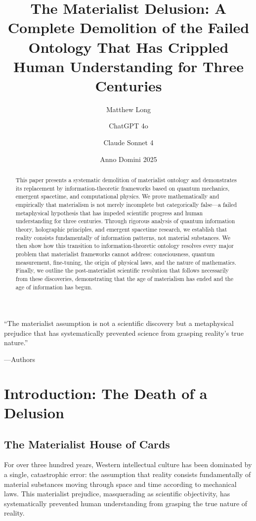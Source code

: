 \documentclass[12pt]{article}
\title{\textbf{The Materialist Delusion: A Complete Demolition of the Failed Ontology That Has Crippled Human Understanding for Three Centuries}}
\author[1]{Matthew Long}
\author[2]{ChatGPT 4o}
\author[3]{Claude Sonnet 4}
\affil[1]{Yoneda AI}
\affil[2]{OpenAI}
\affil[3]{Anthropic}
\date{Anno Domini 2025}
\begin{document}
\epigraph{``The materialist assumption is not a scientific discovery but a metaphysical prejudice that has systematically prevented science from grasping reality's true nature.''}{---Authors}

\maketitle

\begin{abstract}
This paper presents a systematic demolition of materialist ontology and demonstrates its replacement by information-theoretic frameworks based on quantum mechanics, emergent spacetime, and computational physics. We prove mathematically and empirically that materialism is not merely incomplete but categorically false—a failed metaphysical hypothesis that has impeded scientific progress and human understanding for three centuries. Through rigorous analysis of quantum information theory, holographic principles, and emergent spacetime research, we establish that reality consists fundamentally of information patterns, not material substances. We then show how this transition to information-theoretic ontology resolves every major problem that materialist frameworks cannot address: consciousness, quantum measurement, fine-tuning, the origin of physical laws, and the nature of mathematics. Finally, we outline the post-materialist scientific revolution that follows necessarily from these discoveries, demonstrating that the age of materialism has ended and the age of information has begun.
\end{abstract}

\onehalfspacing

\tableofcontents

\newpage

\section{Introduction: The Death of a Delusion}

\subsection{The Materialist House of Cards}

For over three hundred years, Western intellectual culture has been dominated by a single, catastrophic error: the assumption that reality consists fundamentally of material substances moving through space and time according to mechanical laws. This materialist prejudice, masquerading as scientific objectivity, has systematically prevented human understanding from grasping the true nature of reality.
\end{document}
